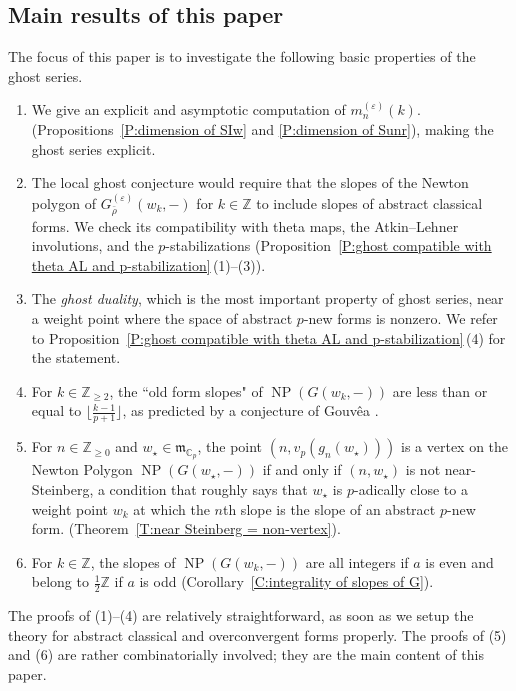 \documentclass[12pt]{amsart}
\theoremstyle{definition}
\numberwithin{equation}{subsection}
\def\gothm{\mathfrak{m}}
\def\CC{\mathbb{C}}
\def\ZZ{\mathbb{Z}}
\DeclareMathOperator{\NP}{NP}
\begin{document}
\subsection{Main results of this paper}
\label{S:main result summarized}
The focus of this paper is to investigate the following basic properties of the ghost series.
\begin{enumerate}
\item 
We give an explicit and asymptotic computation of $m_n^{(\varepsilon)}(k)$. (Propositions~\ref{P:dimension of SIw} and \ref{P:dimension of Sunr}), making the ghost series explicit.
\item 
The local ghost conjecture would require that the slopes of the Newton polygon of $G_{\bar \rho}^{(\varepsilon)}(w_k, -)$ for $k \in \ZZ$ to include slopes of abstract classical forms. We check its compatibility with theta maps,  the Atkin--Lehner involutions, and the $p$-stabilizations (Proposition~\ref{P:ghost compatible with theta AL and p-stabilization}\,(1)--(3)).  
 \item
The \emph{ghost duality}, which is the most important property of ghost series, near a weight point where the space of abstract $p$-new forms  is nonzero. We refer to Proposition~\ref{P:ghost compatible with theta AL and p-stabilization}\,(4) for the statement.
\item For $k \in \ZZ_{\geq 2}$, the ``old form slopes" of $\NP(G(w_k,-))$ are less than or equal to $\big\lfloor\frac{k-1}{p+1}\big\rfloor$, as predicted by a conjecture of Gouv\^ea \cite{gouvea}.

\item  For $n \in \ZZ_{\geq 0}$ and $w_\star \in \gothm_{\CC_p}$, the point $(n, v_p(g_n(w_\star)))$ is a vertex on the Newton Polygon $\NP(G(w_\star, -))$ if and only if $(n, w_\star)$ is not near-Steinberg, a condition that roughly says that $w_\star$ is $p$-adically close to a weight point $w_k$ at which the $n$th slope is the slope of an abstract $p$-new form. (Theorem~\ref{T:near Steinberg = non-vertex}). 

\item For $k \in \ZZ$, the slopes of $\NP(G(w_k,-))$ are all integers if $a$ is even and belong to $\frac 12\ZZ$ if $a$ is odd (Corollary~\ref{C:integrality of slopes of G}). 
\end{enumerate}

The proofs of (1)--(4) are relatively straightforward, as soon as we setup the theory for abstract classical and overconvergent forms properly. The proofs of (5) and (6) are rather combinatorially involved; they are the main content of this paper.
\end{document}
